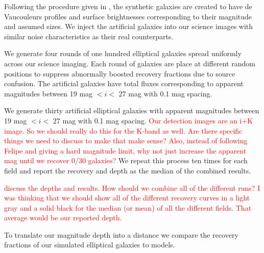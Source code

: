 \documentclass[apj, revtex4]{emulateapj}
\newcommand{\editorial}[1]{\textcolor{red}{#1}}
\begin{document}
Following the procedure given in \cite{Menanteau2010a}, the synthetic galaxies are created to have de Vaucouleurs \citep{DeVaucouleurs1948} profiles and surface brightnesses corresponding to their magnitude and assumed sizes. We inject the artificial galaxies into our science images with similar noise characteristics as their real counterparts.

We generate four rounds of one hundred elliptical galaxies spread uniformly across our science imaging. Each round of galaxies are place at different random positions to suppress abnormally boosted recovery fractions due to source confusion. The artificial galaxies have total fluxes corresponding to apparent magnitudes between 19 mag $< i <$ 27 mag with 0.1 mag spacing. 





We generate thirty artificial elliptical galaxies with apparent magnitudes between 19 mag $< i <$ 27 mag with 0.1 mag spacing. \editorial{Our detection images are an i+K image. So we should really do this for the K-band as well. Are there specific things we need to discuss to make that make sense? Also, instead of following Felipe and giving a hard magnitude limit, why not just increase the apparent mag until we recover 0/30 galaxies?} We repeat this process ten times for each field and report the recovery and depth as the median of the combined results. 

\editorial{discuss the depths and results. How should we combine all of the different runs? I was thinking that we should show all of the different recovery curves in a light gray and a solid black for the median (or mean) of all the different fields. That average would be our reported depth.}

To translate our magnitude depth into a distance we compare the recovery fractions of our simulated elliptical galaxies to models.


\end{document}
